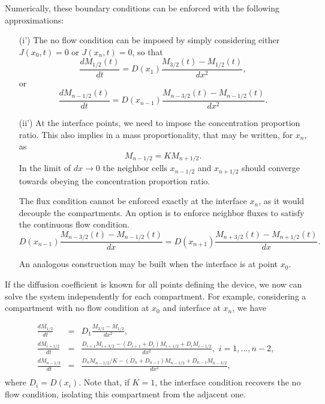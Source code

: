 \documentclass[final,1p,times]{elsarticle}
\begin{document}
Numerically, these boundary conditions can be enforced with the following approximations:
\begin{enumerate}
\item[(i')] The no flow condition can be imposed by simply considering either $J(x_0,t)=0$ or $J(x_n,t)=0$, so that
\begin{equation}
\frac{d M_{1/2}(t)}{dt}= D(x_{1})\frac{M_{3/2}(t)-M_{1/2}(t) }{dx^2},
\end{equation}
or
\begin{equation}
\frac{d M_{n-1/2}(t)}{dt}= D(x_{n-1})\frac{M_{n-3/2}(t)-M_{n-1/2}(t) }{dx^2}.
\end{equation}

\item[(ii')] 
At the interface points, we need to impose the concentration proportion ratio. This also implies in a mass proportionality, that may be written, for $x_n$, as
\begin{equation}
M_{n-1/2}=K M_{n+1/2}.
\end{equation}
In the limit of $dx\rightarrow 0$ the neighbor cells $x_{n-1/2}$ and $x_{n+1/2}$ should converge towards obeying the concentration proportion ratio.

The flux condition cannot be enforced exactly at the interface $x_n$, as it would decouple the compartments. An option is to enforce neighbor fluxes to satisfy the continuous flow condition.
\begin{equation}
 D(x_{n-1})\frac{M_{n-3/2}(t)-M_{n-1/2}(t) }{dx}= D(x_{n+1})\frac{M_{n+3/2}(t)-M_{n+1/2}(t) }{dx}.
\end{equation}


An analogous construction may be built when the interface is at point $x_0$.
\end{enumerate}


If the diffusion coefficient is known for all points defining the device, we now can solve the system independently for each compartment. For example, considering a compartment with no flow condition at $x_0$ and interface at $x_n$, we have

\begin{eqnarray*}
\frac{d M_{1/2}}{dt}&=& D_1\frac{M_{3/2}-M_{1/2} }{dx^2},\\
\frac{d M_{i+1/2}}{dt}&=& \frac{D_{i+1}M_{i+3/2}-(D_{i+1}+D_{i})M_{i+1/2} + D_iM_{i-1/2}}{dx^2}, \,\, i=1,...,n-2,\\
\frac{d M_{n-1/2}}{dt}&=& \frac{D_{n}M_{n-1/2}/K-(D_{n}+D_{n-1})M_{n-1/2} + D_{n-1}M_{n-3/2}}{dx^2}, \\
\end{eqnarray*}
where $D_i=D(x_i)$. Note that, if $K=1$, the interface condition recovers the no flow condition, isolating this compartment from the adjacent one.
\end{document}
